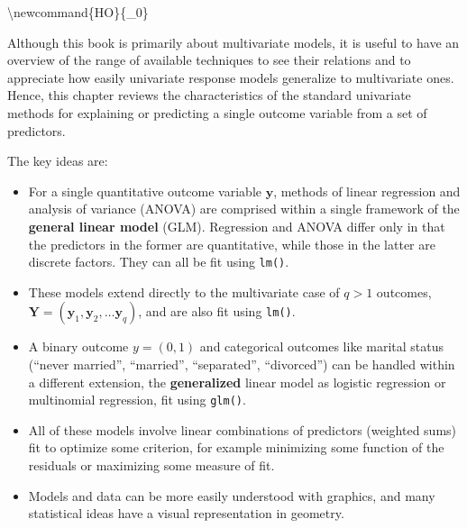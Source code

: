 \documentclass[
  letterpaper,
  10pt,
  krantz2]{krantz}
\begin{document}
{\renewcommand*{\H}{\mathbf{H}}               
\newcommand*{\E}{\mathbf{E}}
\newcommand*{\widebar}[1]{\overline{#1}}

\newcommand{\Var}{\mathsf{Var}}
\newcommand{\Cov}{\mathsf{Cov}}

\textbackslash newcommand\{HO\}\{\_0\}

\newcommand*{\V}{\mathcal{V}}

\newcommand{\pkg}[1]{\textsf{#1}}
\newcommand{\Rpackage}[1]{\pkg{#1} package}

Although this book is primarily about multivariate models, it is useful
to have an overview of the range of available techniques to see their
relations and to appreciate how easily univariate response models
generalize to multivariate ones. Hence, this chapter reviews the
characteristics of the standard univariate methods for explaining or
predicting a single outcome variable from a set of predictors.

The key ideas are:

\begin{itemize}
\item
  For a single quantitative outcome variable \(\mathbf{y}\), methods of
  linear regression and analysis of variance (ANOVA) are comprised
  within a single framework of the \textbf{general linear model} (GLM).
  Regression and ANOVA differ only in that the predictors in the former
  are quantitative, while those in the latter are discrete factors. They
  can all be fit using \texttt{lm()}.
\item
  These models extend directly to the multivariate case of \(q > 1\)
  outcomes,
  \(\mathbf{Y} = (\mathbf{y}_1, \mathbf{y}_2, \dots \mathbf{y}_q)\), and
  are also fit using \texttt{lm()}.
\item
  A binary outcome \(y = (0, 1)\) and categorical outcomes like marital
  status (``never married'', ``married'', ``separated'', ``divorced'')
  can be handled within a different extension, the \textbf{generalized}
  linear model as logistic regression or multinomial regression, fit
  using \texttt{glm()}.
\item
  All of these models involve linear combinations of predictors
  (weighted sums) fit to optimize some criterion, for example minimizing
  some function of the residuals or maximizing some measure of fit.
\item
  Models and data can be more easily understood with graphics, and many
  statistical ideas have a visual representation in geometry.
\end{itemize}

}
\end{document}
